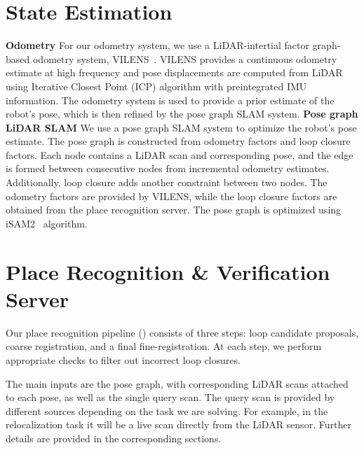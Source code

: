 \section{State Estimation}
\textbf{Odometry} \hspace{0.5em} For our odometry system, we use a LiDAR-intertial factor graph-based odometry system, VILENS~\cite{wisth2023tro}. VILENS provides a continuous odometry estimate at high frequency and pose displacements are computed from LiDAR using Iterative Closest Point (ICP) algorithm with preintegrated IMU information. The odometry system is used to provide a prior estimate of the robot's pose, which is then refined by the pose graph SLAM system. 
\newline
\textbf{Pose graph LiDAR SLAM} \hspace{0.5em} We use a pose graph SLAM system to optimize the robot's pose estimate. The pose graph is constructed from odometry factors and loop closure factors. Each node contains a LiDAR scan and corresponding pose, and the edge is formed between consecutive nodes from incremental odometry estimates. Additionally, loop closure adds another constraint between two nodes. The odometry factors are provided by VILENS, while the loop closure factors are obtained from the place recognition server. The pose graph is optimized using iSAM2~\cite{Kaess2012} algorithm.

\section{Place Recognition \& Verification Server} \label{sec:pipeline}
Our place recognition pipeline () consists of three steps: loop candidate proposals, coarse registration, and a final fine-registration. At each step, we perform appropriate checks to filter out incorrect loop closures.

The main inputs are the pose graph, with corresponding LiDAR scans attached to each pose, as well as the single query scan. The query scan is provided by different sources depending on the task we are solving. For example, in the relocalization task it will be a live scan directly from the LiDAR sensor. Further details are provided in the corresponding sections.

